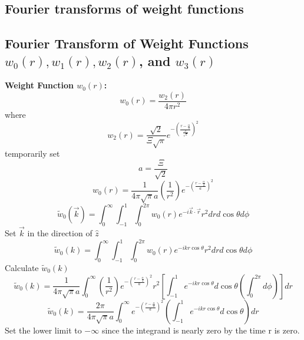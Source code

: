\documentclass[letterpaper,twocolumn,amsmath,amssymb,prb]{revtex4-1}
\begin{document}
\appendix
\begin{widetext}
  \section{Fourier transforms of weight functions}\label{sec:fourier}

\subsection{Fourier Transform of Weight Functions $w_0(r), w_1(r), w_2(r)$, and $w_3(r)$ }
\noindent\textbf{Weight Function $w_0(r)$:}
\begin{equation}{w_0(r)=\frac{w_2(r)}{4{\pi}r^2}}\end{equation}
where
\begin{equation}{w_2(r)=\frac{\sqrt{2}}{\Xi\sqrt{\pi}}e^{-\left(\frac{r-\frac{\alpha}{2}}{\frac{\Xi}{\sqrt{2}}}\right)^2}}\end{equation}
temporarily set 
\begin{equation}{a=\frac{\Xi}{\sqrt{2}}}\end{equation}
\begin{equation}{w_0(r)=\frac{1}{4{\pi}\sqrt{\pi}a}\left(\frac{1}{r^2}\right)e^{-\left(\frac{r-\frac{\alpha}{2}}{a}\right)^2}}\end{equation}
\begin{equation}{\widetilde{w}_0(\vec{k})=\int_{0}^{\infty}\int_{-1}^{1}\int_{0}^{2\pi}w_0(r)e^{-i\vec{k}\cdot{\vec{r}}}r^2d{r}d{\cos\theta}d{\phi}}\end{equation}
Set $\vec{k}$ in the direction of $\hat{z}$
\begin{equation}{\widetilde{w}_0(k)=\int_{0}^{\infty}\int_{-1}^{1}\int_{0}^{2\pi}w_0(r)e^{-ikr\cos\theta}r^2d{r}d{\cos\theta}d{\phi}}\end{equation}
\[{}\]
Calculate $\widetilde{w}_0(k)$ 
\begin{equation}{\widetilde{w}_0(k)=\frac{1}{4{\pi}\sqrt{\pi}a}\int_{0}^{\infty}\left(\frac{1}{r^2}\right)e^{-\left(\frac{r-\frac{\alpha}{2}}{a}\right)^2}r^2\left[\int_{-1}^{1}e^{-ikr\cos\theta}d{\cos\theta}\left(\int_{0}^{2\pi}d{\phi}\right)\right]d{r}}\end{equation}
\[{}\]
\begin{equation}{\widetilde{w}_0(k)=\frac{2\pi}{4{\pi}\sqrt{\pi}a}\int_{0}^{\infty}e^{-\left(\frac{r-\frac{\alpha}{2}}{a}\right)^2}\left(\int_{-1}^{1}e^{-ikr\cos\theta}d{\cos\theta}\right)d{r}}\end{equation}
\[{}\]
Set the lower limit to $-\infty$ since the integrand is nearly zero by the time r is zero. 

\end{widetext}
\end{document}
